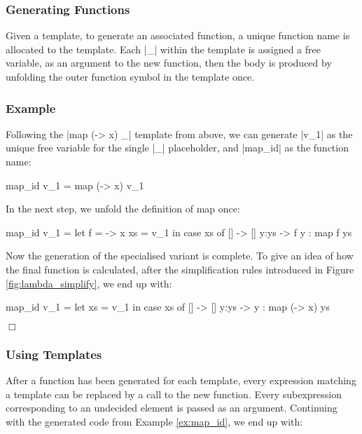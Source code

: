 \documentclass[preprint]{sigplanconf}
\newcounter{exmp}
\newenvironment{exampleany}[1]
    {\subsubsection*{Example #1}}
    {\hfill$\Box$}
\newenvironment{example}
    {\refstepcounter{exmp}
     \begin{exampleany}{\arabic{exmp}}}
    {\end{exampleany}}
\begin{document}
\subsubsection{Generating Functions}

Given a template, to generate an associated function, a unique function name is allocated to the template. Each |_| within the template is assigned a free variable, as an argument to the new function, then the body is produced by unfolding the outer function symbol in the template once.

\begin{example}
\label{ex:map_id}
Following the |map (\x -> x) _| template from above, we can generate |v_1| as the unique free variable for the single |_| placeholder, and |map_id| as the function name:

\begin{code}
map_id v_1 = map (\x -> x) v_1
\end{code}

In the next step, we unfold the definition of map once:

\begin{code}
map_id v_1 = let  f   = \x -> x
                  xs  = v_1
             in   case  xs of
                        []    -> []
                        y:ys  -> f y : map f ys
\end{code}

Now the generation of the specialised variant is complete. To give an idea of how the final function is calculated, after the simplification rules introduced in Figure \ref{fig:lambda_simplify}, we end up with:

\begin{code}
map_id v_1 =  let  xs = v_1
              in   case  xs of
                         []    -> []
                         y:ys  -> y : map (\x -> x) ys
\end{code}
\end{example}

\subsubsection{Using Templates}

After a function has been generated for each template, every expression matching a template can be replaced by a call to the new function. Every subexpression corresponding to an undecided element is passed as an argument. Continuing with the generated code from Example \ref{ex:map_id}, we end up with:
\end{document}

